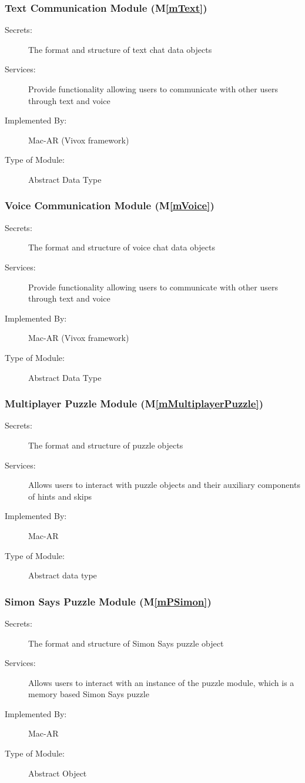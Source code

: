 \documentclass[12pt, titlepage]{article}
\newcommand{\mref}[1]{M\ref{#1}}
\begin{document}
\subsubsection{Text Communication Module (\mref{mText})}
\begin{description}
\item[Secrets:]The format and structure of text chat data objects
\item[Services:]Provide functionality allowing users to communicate with other users through text and voice
\item[Implemented By:] Mac-AR (Vivox framework)
\item[Type of Module:] Abstract Data Type
\end{description}

\subsubsection{Voice Communication Module (\mref{mVoice})}
\begin{description}
\item[Secrets:]The format and structure of voice chat data objects
\item[Services:]Provide functionality allowing users to communicate with other users through text and voice
\item[Implemented By:] Mac-AR (Vivox framework)
\item[Type of Module:] Abstract Data Type
\end{description}

\subsubsection{Multiplayer Puzzle Module (\mref{mMultiplayerPuzzle})}
\begin{description}
\item[Secrets:]The format and structure of puzzle objects
\item[Services:]Allows users to interact with puzzle objects and their auxiliary components of hints and skips
\item[Implemented By:] Mac-AR
\item[Type of Module:] Abstract data type
\end{description}

\subsubsection{Simon Says Puzzle Module (\mref{mPSimon})}
\begin{description}
\item[Secrets:]The format and structure of Simon Says puzzle object
\item[Services:]Allows users to interact with an instance of the puzzle module, which is a memory based Simon Says puzzle
\item[Implemented By:] Mac-AR
\item[Type of Module:] Abstract Object
\end{description}
\end{document}

